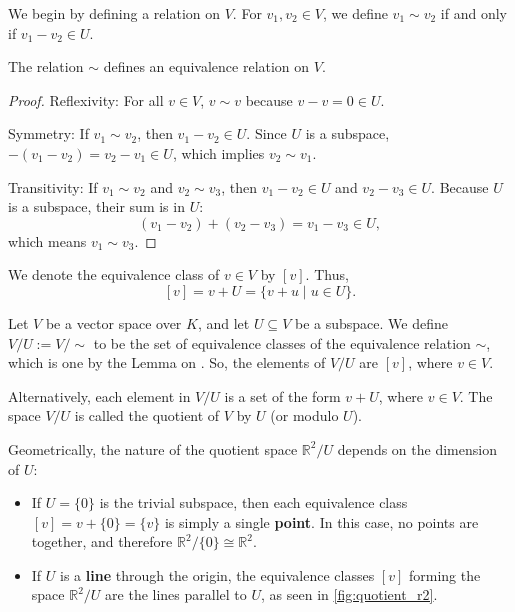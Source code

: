 We begin by defining a relation on $V$. For $v_1, v_2 \in V$, we define $v_1 \sim v_2$ if and only if $v_1 - v_2 \in U$.

\begin{lemma*}
\label{lem:quotient_equivalence_relation}
  The relation $\sim$ defines an equivalence relation on $V$.
\end{lemma*}

\begin{proof}
  Reflexivity: For all $v \in V$, $v \sim v$ because $v - v = 0 \in U$.

  Symmetry: If $v_1 \sim v_2$, then $v_1 - v_2 \in U$. Since $U$ is a subspace, $-(v_1 - v_2) = v_2 - v_1 \in U$, which implies $v_2 \sim v_1$.

  Transitivity: If $v_1 \sim v_2$ and $v_2 \sim v_3$, then $v_1 - v_2 \in U$ and $v_2 - v_3 \in U$. Because $U$ is a subspace, their sum is in $U$:
  \[ (v_1 - v_2) + (v_2 - v_3) = v_1 - v_3 \in U, \]
  which means $v_1 \sim v_3$.
\end{proof}

We denote the equivalence class of $v \in V$ by $[v]$. Thus,
\[ [v] = v + U = \{v + u \mid u \in U\}. \]

\begin{definition}
  \label{def:quotient_space}
  Let $V$ be a vector space over $K$, and let $U \subseteq V$ be a subspace. We define $V/U := V/\sim$ to be the set of equivalence classes of the equivalence relation $\sim$, which is one by the Lemma on . So, the elements of $V/U$ are $[v]$, where $v \in V$.
  
  Alternatively, each element in $V/U$ is a set of the form $v + U$, where $v \in V$. The space $V/U$ is called the quotient of $V$ by $U$ (or modulo $U$).
\end{definition}
\bigbreak
Geometrically, the nature of the quotient space $\mathbb{R}^2/U$ depends on the dimension of $U$:
\begin{itemize}
  \item If $U = \{0\}$ is the trivial subspace, then each equivalence class $[v] = v + \{0\} = \{v\}$ is simply a single \textbf{point}. In this case, no points are  together, and therefore $\mathbb{R}^2/\{0\} \cong \mathbb{R}^2$.
  \item If $U$ is a \textbf{line} through the origin, the equivalence classes $[v]$ forming the space $\mathbb{R}^2/U$ are the lines parallel to $U$, as seen in \cref{fig:quotient_r2}.
\end{itemize}

